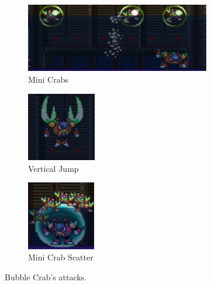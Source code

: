 \begin{figure}[htp]
	\ContinuedFloat
	\centering
	\begin{subfigure}{\linewidth}
		\centering
		\includegraphics[height=3cm]{figures/X2/Bubble_crab/Crab_minicrab.png}
		\caption{Mini Crabs}
	\end{subfigure}
	\begin{subfigure}{0.30\linewidth}
		\centering
		\includegraphics[height=3cm]{figures/X2/Bubble_crab/Crab_pinch.png}
		\caption{Vertical Jump}
	\end{subfigure}
	\begin{subfigure}{0.30\linewidth}
		\centering
		\includegraphics[height=3cm]{figures/X2/Bubble_crab/Crab_DM.png}
		\caption{Mini Crab Scatter}
	\end{subfigure}
	\caption{Bubble Crab's attacks.}	
\end{figure}
